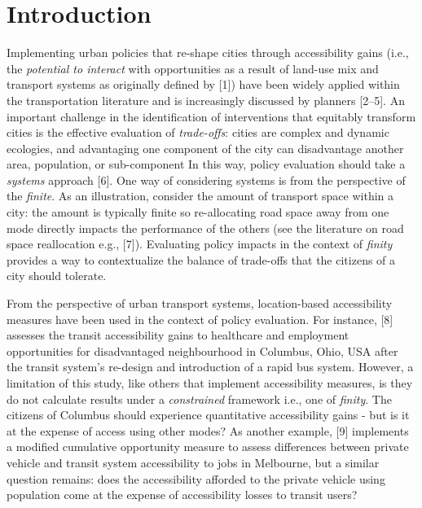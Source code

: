 \documentclass[10pt,letterpaper]{article}
\begin{document}

\linenumbers

\hypertarget{introduction}{%
\section{Introduction}\label{introduction}}

Implementing urban policies that re-shape cities through accessibility
gains (i.e., the \emph{potential to interact} with opportunities as a
result of land-use mix and transport systems as originally defined by
{[}1{]}) have been widely applied within the transportation literature
and is increasingly discussed by planners {[}2--5{]}. An important
challenge in the identification of interventions that equitably
transform cities is the effective evaluation of \emph{trade-offs}:
cities are complex and dynamic ecologies, and advantaging one component
of the city can disadvantage another area, population, or sub-component
In this way, policy evaluation should take a \emph{systems} approach
{[}6{]}. One way of considering systems is from the perspective of the
\emph{finite}. As an illustration, consider the amount of transport
space within a city: the amount is typically finite so re-allocating
road space away from one mode directly impacts the performance of the
others (see the literature on road space reallocation e.g., {[}7{]}).
Evaluating policy impacts in the context of \emph{finity} provides a way
to contextualize the balance of trade-offs that the citizens of a city
should tolerate.

From the perspective of urban transport systems, location-based
accessibility measures have been used in the context of policy
evaluation. For instance, {[}8{]} assesses the transit accessibility
gains to healthcare and employment opportunities for disadvantaged
neighbourhood in Columbus, Ohio, USA after the transit system's
re-design and introduction of a rapid bus system. However, a limitation
of this study, like others that implement accessibility measures, is
they do not calculate results under a \emph{constrained} framework i.e.,
one of \emph{finity}. The citizens of Columbus should experience
quantitative accessibility gains - but is it at the expense of access
using other modes? As another example, {[}9{]} implements a modified
cumulative opportunity measure to assess differences between private
vehicle and transit system accessibility to jobs in Melbourne, but a
similar question remains: does the accessibility afforded to the private
vehicle using population come at the expense of accessibility losses to
transit users?
\end{document}
